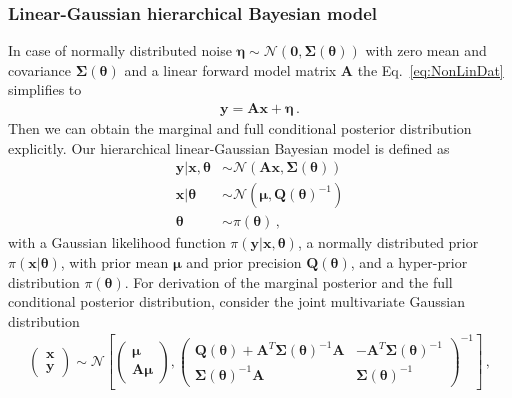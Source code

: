 \subsubsection{Linear-Gaussian hierarchical Bayesian model}
\label{subsec:LinBay}
In case of normally distributed noise $\bm{\eta} \sim \mathcal{N}(\bm{0},\bm{\Sigma}(\bm{\theta}))$ with zero mean and covariance $\bm{\Sigma}(\bm{\theta})$ and a linear forward model matrix $\bm{A}$ the Eq.~\ref{eq:NonLinDat} simplifies to
\begin{align}
	\bm{y} = \bm{A} \bm{x} + \bm{\eta} \, .
	\label{eq:LinDat}
\end{align}
Then we can obtain the marginal and full conditional posterior distribution explicitly.
Our hierarchical linear-Gaussian Bayesian model is defined as
\begin{subequations}
	\label{eq:GenBayMode}
	\begin{align}
		\bm{y} |  \bm{x}, \bm{\theta} &\sim \mathcal{N}(\bm{A} \bm{x}, \bm{\Sigma}(\bm{\theta}) ) \\
		\bm{x} |  \bm{\theta} &\sim \mathcal{N}(\bm{\mu}, \bm{Q}(\bm{\theta})^{-1} ) \\
		\bm{\theta} &\sim \pi(\bm{\theta}) \,  ,
	\end{align}
\end{subequations}
with a Gaussian likelihood function $\pi(\bm{y} | \bm{x}, \bm{\theta} )$, a normally distributed prior $\pi(\bm{x}|\bm{\theta})$, with prior mean $\bm{\mu}$ and prior precision $\bm{Q}(\bm{\theta})$, and a hyper-prior distribution $\pi(\bm{\theta})$.
For derivation of the marginal posterior and the full conditional posterior distribution, consider the joint multivariate Gaussian distribution
\begin{align}
	\begin{pmatrix}
		\bm{x} \\
		\bm{y}
	\end{pmatrix}\sim \mathcal{N}\left[  \begin{pmatrix}
		\bm{\mu} \\
		\bm{A}\bm{\mu}
	\end{pmatrix},\begin{pmatrix}
		\bm{Q}(\bm{\theta}) + \bm{A}^T \bm{\Sigma}(\bm{\theta})^{-1} \bm{A} & - \bm{A}^T \bm{\Sigma}(\bm{\theta})^{-1} \\
		\bm{\Sigma}(\bm{\theta})^{-1} \bm{A} & \bm{\Sigma}(\bm{\theta})^{-1} 
	\end{pmatrix}^{-1} \right] \, , 	\label{eq:jointMultiGaus}
\end{align}
